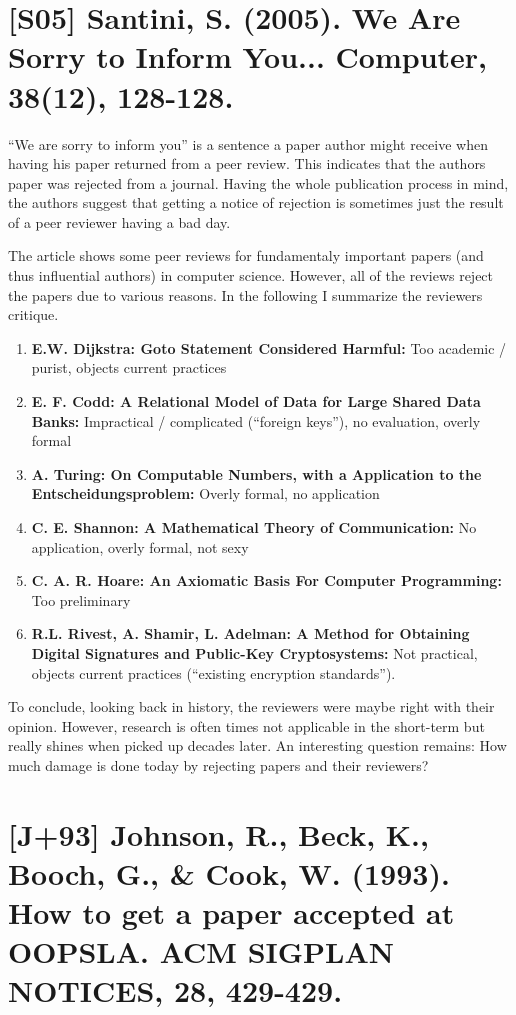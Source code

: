 \documentclass[a4paper,12pt,english]{scrartcl}
\newcommand{\papertitle}[2]{
	\section{[#1] #2}
}
\begin{document}
\pagestyle{fancy} %

\papertitle{S05}{Santini, S. (2005). We Are Sorry to Inform You... Computer, 38(12), 128-128.}

\enquote{We are sorry to inform you} is a sentence a paper author might receive when having his paper returned from a peer review. This indicates that the authors paper was rejected from a journal. Having the whole publication process in mind, the authors suggest that getting a notice of rejection is sometimes just the result of a peer reviewer having a bad day.

The article shows some peer reviews for fundamentaly important papers (and thus influential authors) in computer science. However, all of the reviews reject the papers due to various reasons. In the following I summarize the reviewers critique.

\begin{enumerate}
	\item \textbf{E.W. Dijkstra: Goto Statement Considered Harmful:} Too academic / purist, objects current practices
	\item \textbf{E. F. Codd: A Relational Model of Data for Large Shared Data Banks:} Impractical / complicated (\enquote{foreign keys}), no evaluation, overly formal
	\item \textbf{A. Turing: On Computable Numbers, with a Application to the Entscheidungsproblem:} Overly formal, no application
	\item \textbf{C. E. Shannon: A Mathematical Theory of Communication:} No application, overly formal, not sexy
	\item \textbf{C. A. R. Hoare: An Axiomatic Basis For Computer Programming:} Too preliminary
	\item \textbf{R.L. Rivest, A. Shamir, L. Adelman: A Method for Obtaining Digital Signatures and Public-Key Cryptosystems:} Not practical, objects current practices (\enquote{existing encryption standards}).
\end{enumerate}

To conclude, looking back in history, the reviewers were maybe right with their opinion. However, research is often times not applicable in the short-term but really shines when picked up decades later. An interesting question remains: How much damage is done today by rejecting papers and their reviewers?

\newpage

\papertitle{J+93}{Johnson, R., Beck, K., Booch, G., \& Cook, W. (1993). How to get a paper accepted at OOPSLA. ACM SIGPLAN NOTICES, 28, 429-429.}
\end{document}
